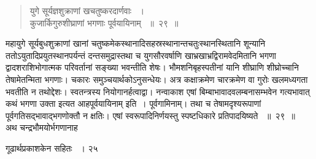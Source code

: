 \documentclass[11pt, openany]{book}
\begin{document}
 
 \begin{quote}
  {\ssi युगे सूर्यज्ञशुक्राणां खचतुष्करदार्णवाः ~।\\
कुजार्किगुरुशीघ्राणां भगणाः पूर्वयायिनाम् ~॥~२९~॥}
\end{quote}
\begin{sloppypar}
 महायुगे सूर्यबुधशुक्राणां खानां चतुष्कमेकस्थानादिसहस्रस्थानान्तचतुःस्थानस्थितानि शून्यानि ततोऽयुतादिप्रयुतस्थानपर्यन्तं दन्तसमुद्रास्तथा च युगसौरवर्षाणि खाभ्रखाभ्रद्विरामवेदमितानि भगणा द्वादशराशिभोगात्मक परिवर्तानां सङ्ख्या भवन्तीति शेषः। भौमशनिबृहस्पतीनां यानि शीघ्राणि शीघ्रोच्चानि तेषामेतन्मिता भगणाः। चकारः समुञ्चयार्थकोऽनुसन्धेयः। अत्र कक्षाक्रमेण चारक्रमेण वा गुरोः खलमध्यगता भवतीति न तथोद्देशः। स्वतन्त्रस्य नियोगानर्हत्वाद्वा। नन्वाकाश एषां बिम्बाभावादवलम्बनासम्भवेन गत्यभावात् कथं भगणा उक्ता इत्यत आह\textendash पूर्वयायिनाम् इति~। पूर्वगामिनाम्। तथा च तेषामदृश्यरूपाणां पूर्वगतिसद्भावाद्भगणोक्तौ न क्षतिः। एषां स्वरूपादिनिर्णयस्तु स्पष्टधिकारे प्रतिपादयिष्यते ~॥~२९~॥\\ 
 \noindent अथ चन्द्रभौमयोर्भगणानाह\textendash
\end{sloppypar}

\newpage

\hspace{3cm} गूढार्थप्रकाशकेन सहितः ~। \hfill २५
\vspace{1cm}
 
\end{document}
